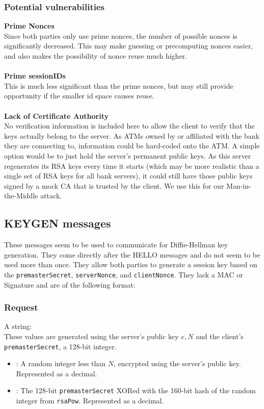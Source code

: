 \documentclass{article}
\newcommand{\code}[1]{\tcbox[
    on line,
    colback=codebackground, boxsep=2pt,
    colframe=white, boxrule=0pt,
    top=0pt, bottom=0pt, left=0pt, right=0pt
]{\texttt{#1}}}
\begin{document}
\subsubsection{Potential vulnerabilities}
\textbf{Prime Nonces} \\
Since both parties only use prime nonces, the number of possible nonces is significantly decreased.
This may make guessing or precomputing nonces easier, and also makes the possibility of nonce reuse much higher. \\
\\
\textbf{Prime sessionIDs} \\
This is much less significant than the prime nonces, but may still provide opportunity if the smaller id space causes reuse. \\
\\
\textbf{Lack of Certificate Authority} \\
No verification information is included here to allow the client to verify that the keys actually belong to the server.
As ATMs owned by or affiliated with the bank they are connecting to, information could be hard-coded onto the ATM.
A simple option would be to just hold the server's permanent public keys. As this server regenerates its RSA keys every time
it starts (which may be more realistic than a single set of RSA keys for all bank servers),
it could still have those public keys signed by a mock CA that is trusted by the client.
We use this for our Man-in-the-Middle attack.

\subsection{KEYGEN messages}
These messages seem to be used to communicate for Diffie-Hellman key generation. They come directly after the HELLO messages and do not seem to be used more than once. They allow both parties to generate a session key based on the \texttt{premasterSecret}, \texttt{serverNonce}, and \texttt{clientNonce}.
They lack a MAC or Signature and are of the following format:

\subsubsection{Request}
A string: \code{\textit{rsaPow}|\textit{rsaCipher}} \\
These values are generated using the server's public key $e,N$ and the client's \texttt{premasterSecret}, a 128-bit integer.
\begin{itemize}
    \item \code{rsaPow}: A random integer less than $N$, encrypted using the server's public key. Represented as a decimal.
    \item \code{rsaCipher}: The 128-bit \texttt{premasterSecret} XORed with the 160-bit hash of the random integer from \texttt{rsaPow}. Represented as a decimal.
\end{itemize}
\end{document}
